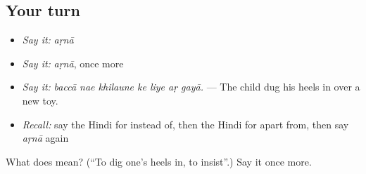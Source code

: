 \subsection*{Your turn}
\begin{itemize}
\raggedright
  \item \emph{Say it:} \emph{aṛnā}
  \item \emph{Say it:} \emph{aṛnā}, once more
  \item \emph{Say it:} \emph{baccā nae khilaune ke liye aṛ gayā.} — The child dug his heels in over a new toy.
  \item \emph{Recall:} say the Hindi for instead of, then the Hindi for apart from, then say \emph{aṛnā} again
\end{itemize}

\begin{tcolorbox}[breakable,colback=teal!4,colframe=teal!35!black,title={Before you move on}]
What does  mean? (\textquotedblleft{}To dig one's heels in, to insist\textquotedblright{}.) Say it once more.
\end{tcolorbox}
